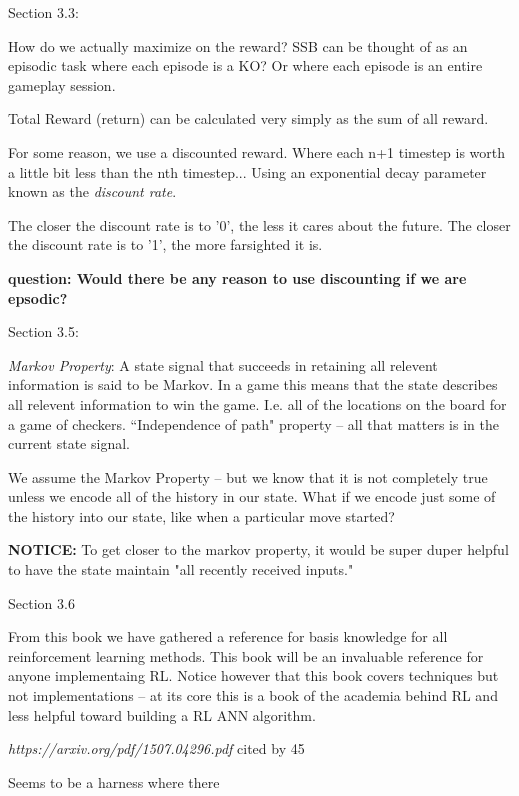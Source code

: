 Section 3.3: 

How do we actually maximize on the reward?
SSB can be thought of as an episodic task where each episode is a KO?
Or where each episode is an entire gameplay session.

Total Reward (return) can be calculated very simply as the sum of all reward.

For some reason, we use a discounted reward.
Where each n+1 timestep is worth a little bit less than the nth timestep...
Using an exponential decay parameter known as the \textit{discount rate}.

The closer the discount rate is to '0', the less it cares about the future.
The closer the discount rate is to '1', the more farsighted it is.

\textbf{question: Would there be any reason to use discounting if we are epsodic?}


Section 3.5:

\textit{Markov Property}: A state signal that succeeds in retaining all relevent information is said to be Markov.
In a game this means that the state describes all relevent information to win the game.
I.e. all of the locations on the board for a game of checkers.
``Independence of path" property -- all that matters is in the current state signal.

We assume the Markov Property -- but we know that it is not completely true unless we encode all of the history in our state.
What if we encode just some of the history into our state, like when a particular move started?

\textbf{NOTICE:}
To get closer to the markov property, it would be super duper helpful to have the state maintain "all recently received inputs."

Section 3.6

From this book we have gathered a reference for basis knowledge for all reinforcement learning methods.
This book will be an invaluable reference for anyone implementaing RL.
Notice however that this book covers techniques but not implementations -- at its core this is a book of the academia behind RL and less helpful toward building a RL ANN algorithm.


\textit{https://arxiv.org/pdf/1507.04296.pdf}
cited by 45

Seems to be a harness where there 
